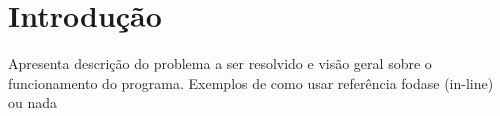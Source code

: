\chapter*{Introdução}
\label{sec-intro}

Apresenta descrição do problema a ser resolvido e visão geral sobre o funcionamento do programa.
Exemplos de como usar referência fodase (in-line) ou nada
